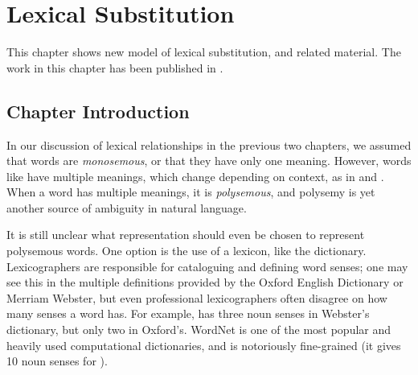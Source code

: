 \chapter{Lexical Substitution}
\label{ch:lexsub}

This chapter shows new model of lexical substitution, and related
material. The work in this chapter has been published in
.

\section{Chapter Introduction}

%

In our discussion of lexical relationships in the previous two chapters, we
assumed that words are {\em monosemous}, or that they have only one meaning.
However, words like  have multiple meanings, which change depending
on context, as in  and . When a word has
multiple meanings, it is {\em polysemous}, and polysemy is yet another source
of ambiguity in natural language.

It is still unclear what representation should even be chosen
to represent polysemous words. One option is the use of a lexicon, like the
dictionary.  Lexicographers are responsible for cataloguing and defining word
senses; one may see this in the multiple definitions provided by the Oxford
English Dictionary or Merriam Webster, but even professional lexicographers
often disagree on how many senses a word has. For example,  has
three noun senses in Webster's dictionary, but only two in Oxford's.
WordNet \cite{miller:1995:acm} is one of the most popular and heavily used
computational dictionaries, and is notoriously fine-grained (it gives 10
noun senses for ).


